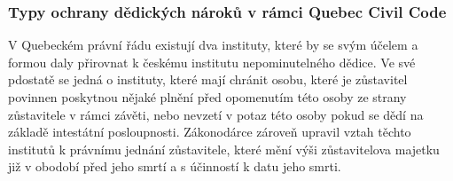 \documentclass{article}
\begin{document}








\subsubsection{Typy ochrany dědických nároků v rámci Quebec Civil Code}

V Quebeckém právní řádu existují dva instituty, které by se svým účelem a formou daly přirovnat k českému institutu nepominutelného dědice. Ve své pdostatě se jedná o instituty, které mají chránit osobu, které je zůstavitel povinnen poskytnou nějaké plnění před opomenutím této osoby ze strany zůstavitele v rámci závěti, nebo nevzetí v potaz této osoby pokud se dědí na základě intestátní posloupnosti. Zákonodárce zároveň upravil vztah těchto institutů k právnímu jednání zůstavitele, které mění výši zůstavitelova majetku již v obodobí před jeho smrtí a s účinností k datu jeho smrti. \\
\end{document}
